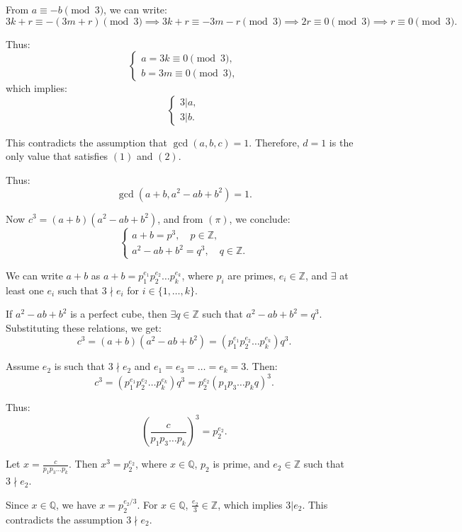 \documentclass{article}
\begin{document}
From \(a \equiv -b \pmod{3}\), we can write:
\[
3k + r \equiv -(3m + r) \pmod{3} \implies 3k + r \equiv -3m - r \pmod{3} \implies 2r \equiv 0 \pmod{3} \implies r \equiv 0 \pmod{3}.
\]

Thus:
\[
\begin{cases}
a = 3k \equiv 0 \pmod{3}, \\
b = 3m \equiv 0 \pmod{3},
\end{cases}
\]
which implies:
\[
\begin{cases}
3 | a, \\
3 | b.
\end{cases}
\]

This contradicts the assumption that \(\gcd(a, b, c) = 1\). Therefore, \(d = 1\) is the only value that satisfies \((1)\) and \((2)\).

Thus:
\[
\gcd(a + b, a^2 - ab + b^2) = 1. \tag{\(\pi\)}
\]

Now \(c^3 = (a + b)(a^2 - ab + b^2)\), and from \((\pi)\), we conclude:
\[
\begin{cases}
a + b = p^3, \quad p \in \mathbb{Z}, \\
a^2 - ab + b^2 = q^3, \quad q \in \mathbb{Z}.
\end{cases}
\]


We can write \(a+b\) as \(a+b = p_1^{e_1}p_2^{e_2} \dots p_k^{e_k}\), where \(p_i\) are primes, \(e_i \in \mathbb{Z}\), and \(\exists\) at least one \(e_i\) such that \(3 \nmid e_i\) for \(i \in \{1, \dots, k\}\).

If \(a^2 - ab + b^2\) is a perfect cube, then \(\exists q \in \mathbb{Z}\) such that \(a^2 - ab + b^2 = q^3\). Substituting these relations, we get:
\[
c^3 = (a + b)(a^2 - ab + b^2) = (p_1^{e_1}p_2^{e_2} \dots p_k^{e_k})q^3.
\]

Assume \(e_2\) is such that \(3 \nmid e_2\) and \(e_1 = e_3 = \dots = e_k = 3\). Then:
\[
c^3 = (p_1^{e_1}p_2^{e_2} \dots p_k^{e_k})q^3 = p_2^{e_2}(p_1p_3 \dots p_kq)^3.
\]

Thus:
\[
\left( \frac{c}{p_1p_3 \dots p_k} \right)^3 = p_2^{e_2}.
\]

Let \(x = \frac{c}{p_1p_3 \dots p_k}\). Then \(x^3 = p_2^{e_2}\), where \(x \in \mathbb{Q}\), \(p_2\) is prime, and \(e_2 \in \mathbb{Z}\) such that \(3 \nmid e_2\). 

Since \(x \in \mathbb{Q}\), we have \(x = p_2^{e_2/3}\). For \(x \in \mathbb{Q}\), \(\frac{e_2}{3} \in \mathbb{Z}\), which implies \(3 | e_2\). This contradicts the assumption \(3 \nmid e_2\).
\end{document}
